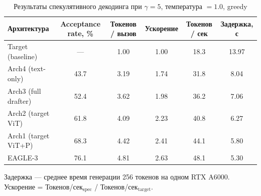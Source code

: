\documentclass[12pt, a4paper]{article}
\begin{document}
\begin{table}[h]
\centering
\caption{Результаты спекулятивного декодинга при $\gamma = 5$, температура $= 1.0$, greedy}
\label{tab:inference_main}
\renewcommand{\arraystretch}{1.35}
\begin{tabular}{
  l
  S[table-format=2.1]
  S[table-format=1.2]
  S[table-format=1.2]
  S[table-format=2.1]
  S[table-format=1.2]
}
\toprule
\textbf{Архитектура} &
{\textbf{Acceptance rate, \%}} &
{\textbf{Токенов / вызов}} &
{\textbf{Ускорение}} &
{\textbf{Токенов / сек}} &
{\textbf{Задержка, с}} \\
\midrule
Target (baseline)      & {—}   & 1.00 & 1.00 & 18.3 & 13.97 \\
\midrule
Arch4 (text-only)      & 43.7  & 3.19 & 1.74 & 31.8 &  8.04 \\
Arch3 (full drafter)   & 52.4  & 3.62 & 1.98 & 36.2 &  7.06 \\
Arch2 (target ViT)     & 61.8  & 4.09 & 2.23 & 40.8 &  6.27 \\
Arch1 (target ViT+P)   & 68.3  & 4.42 & 2.41 & 44.1 &  5.80 \\
EAGLE-3                & 76.1  & 4.81 & 2.63 & 48.1 &  5.30 \\
\bottomrule
\end{tabular}
\smallskip

\footnotesize
Задержка — среднее время генерации 256 токенов на одном RTX A6000.
Ускорение = Токенов/сек$_\text{spec}$ / Токенов/сек$_\text{target}$.
\end{table}
\end{document}
